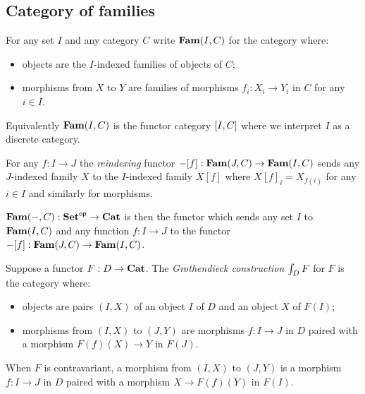 \subsection{Category of families}

\begin{definition}
For any set $I$ and any category $C$ write $\mathbf{Fam}(I,C)$ for the category where:
\begin{itemize}
\item objects are the $I$-indexed families of objects of $C$;
\item morphisms from $X$ to $Y$ are families of morphisms $f_i: X_i \to Y_i$ in $C$ for any $i \in I$.
\end{itemize}
\end{definition}

\noindent Equivalently $\mathbf{Fam}(I,C)$ is the functor category $[I,C]$ where we interpret $I$ as a discrete
category.

\begin{definition}[Reindexing]
For any $f: I \to J$ the \emph{reindexing} functor $-[f]: \mathbf{Fam}(J,C) \to \mathbf{Fam}(I,C)$ sends any
$J$-indexed family $X$ to the $I$-indexed family $X[f]$ where $X[f]_i = X_{f(i)}$ for any $i \in I$ and
similarly for morphisms.
\end{definition}

\begin{definition}
$\mathbf{Fam}(-,C): \mathbf{Set}^{\mathsf{op}} \to \mathbf{Cat}$ is then the functor which sends any set $I$ to $\mathbf{Fam}(I,C)$ and any function
$f: I \to J$ to the functor $-[f]: \mathbf{Fam}(J,C) \to \mathbf{Fam}(I,C)$.
\end{definition}

\begin{definition}
Suppose a functor $F: D \to \mathbf{Cat}$. The \emph{Grothendieck construction} $\int_{D}F$ for $F$ is the
category where:
\begin{itemize}
\item objects are pairs $(I, X)$ of an object $I$ of $D$ and an object $X$ of $F(I)$;
\item morphisms from $(I, X)$ to $(J, Y)$ are morphisms $f: I \to J$ in $D$ paired with a morphism $F(f)(X)
\to Y$ in $F(J)$.
\end{itemize}
\end{definition}

\noindent When $F$ is contravariant, a morphism from $(I, X)$ to $(J, Y)$ is a morphism $f: I \to J$ in $D$
paired with a morphism $X \to F(f)(Y)$ in $F(I)$.

